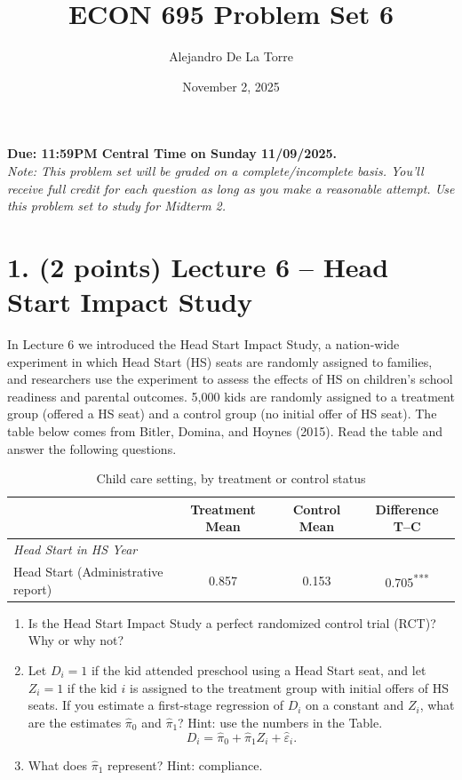 \documentclass[12pt]{article}
\title{ECON 695 Problem Set 6}
\author{Alejandro De La Torre}
\date{November 2, 2025}
\begin{document}
\maketitle

\noindent\textbf{Due: 11:59PM Central Time on Sunday 11/09/2025.}\\
\emph{Note: This problem set will be graded on a complete/incomplete basis. You’ll receive full credit for each question as long as you make a reasonable attempt. Use this problem set to study for Midterm 2.}

\bigskip

\section*{1. (2 points) Lecture 6 -- Head Start Impact Study}
In Lecture 6 we introduced the Head Start Impact Study, a nation-wide experiment in which Head Start (HS) seats are randomly assigned to families, and researchers use the experiment to assess the effects of HS on children’s school readiness and parental outcomes. 5,000 kids are randomly assigned to a treatment group (offered a HS seat) and a control group (no initial offer of HS seat). The table below comes from Bitler, Domina, and Hoynes (2015). Read the table and answer the following questions.

\begin{table}[h!]
  \centering
  \caption{Child care setting, by treatment or control status}
  \label{tab:hs_table2}
  \begin{tabular}{l S S S}
    \toprule
    & {Treatment Mean} & {Control Mean} & {Difference T--C} \\
    \midrule
    \emph{Head Start in HS Year} & & & \\
    Head Start (Administrative report) & 0.857 & 0.153 & 0.705\textsuperscript{***} \\
    \bottomrule
  \end{tabular}
\end{table}

\begin{enumerate}[label=\textbf{(\alph*)}, leftmargin=1.5em]
  \item Is the Head Start Impact Study a perfect randomized control trial (RCT)? Why or why not?\\[0.5em]
  \vspace{3cm}

  \item Let $D_i=1$ if the kid attended preschool using a Head Start seat, and let $Z_i=1$ if the kid $i$ is assigned to the treatment group with initial offers of HS seats. If you estimate a first-stage regression of $D_i$ on a constant and $Z_i$, what are the estimates $\hat{\pi}_0$ and $\hat{\pi}_1$? Hint: use the numbers in the Table.
  \[
    D_i = \hat{\pi}_0 + \hat{\pi}_1 Z_i + \hat{\varepsilon}_i.
  \]
  \vspace{3cm}

  \item What does $\hat{\pi}_1$ represent? Hint: compliance.\\[0.5em]
  \vspace{3cm}
\end{enumerate}
\end{document}
